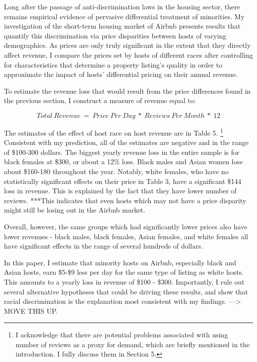 
Long after the passage of anti-discrimination laws in the housing sector, there remains empirical evidence of pervasive differential treatment of minorities. My investigation of the short-term housing market of Airbnb presents results that quantify this discrimination via price disparities between hosts of varying demographics. As prices are only truly significant in the extent that they directly affect revenue, I compare the prices set by hosts of different races after controlling for characteristics that determine a property listing's quality in order to approximate the impact of hosts' differential pricing on their annual revenue.

To estimate the revenue loss that would result from the price differences found in the previous section, I construct a measure of revenue equal to: 

\[Total \: Revenue \ = \ Price \: Per \: Day \ * \ Reviews \: Per \: Month \ * \ 12\] 

The estimates of the effect of host race on host revenue are in Table 5.%
	\footnote{I acknowledge that there are potential problems associated with using number of reviews as a proxy for demand, which are briefly mentioned in the introduction. I fully discuss them in Section 5.}
Consistent with my prediction, all of the estimates are negative and in the range of \$100-300 dollars. The biggest yearly revenue loss in the entire sample is for black females at \$300, or about a 12\% loss. Black males and Asian women lose about \$160-180 throughout the year. Notably, white females, who have no statistically significant effects on their price in Table 3, have a significant \$144 loss in revenue. This is explained by the fact that they have lower number of reviews. ***This indicates that even hosts which may not have a price disparity might still be losing out in the Airbnb market. 

 Overall, however, the same groups which had significantly lower prices also have lower revenues - black males, black females, Asian females, and white females all have significant effects in the range of several hundreds of dollars. 

In this paper, I estimate that minority hosts on Airbnb, especially black and Asian hosts, earn \$5-\$9 less per day for the same type of listing as white hosts. This amounts to a yearly loss in revenue of \$100 - \$300. Importantly, I rule out several alternative hypotheses that could be driving these results, and show that racial discrimination is the explanation most consistent with my findings. ---> MOVE THIS UP. 

